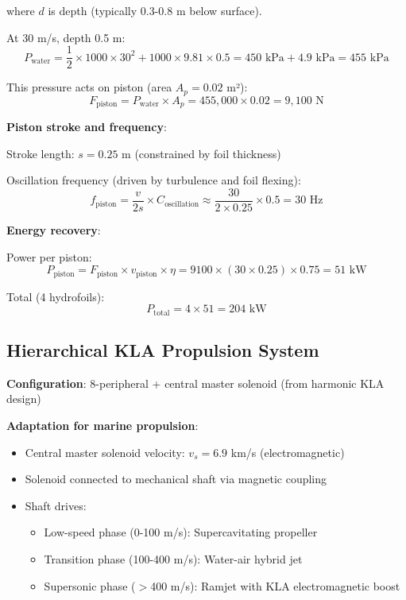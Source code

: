 \documentclass[12pt,a4paper]{article}
\begin{document}
where $d$ is depth (typically 0.3-0.8 m below surface).

At 30 m/s, depth 0.5 m:
\begin{equation}
P_{\text{water}} = \frac{1}{2} \times 1000 \times 30^2 + 1000 \times 9.81 \times 0.5 = 450 \text{ kPa} + 4.9 \text{ kPa} = 455 \text{ kPa}
\end{equation}

This pressure acts on piston (area $A_p = 0.02$ m²):
\begin{equation}
F_{\text{piston}} = P_{\text{water}} \times A_p = 455,000 \times 0.02 = 9,100 \text{ N}
\end{equation}

\textbf{Piston stroke and frequency}:

Stroke length: $s = 0.25$ m (constrained by foil thickness)

Oscillation frequency (driven by turbulence and foil flexing):
\begin{equation}
f_{\text{piston}} = \frac{v}{2s} \times C_{\text{oscillation}} \approx \frac{30}{2 \times 0.25} \times 0.5 = 30 \text{ Hz}
\end{equation}

\textbf{Energy recovery}:

Power per piston:
\begin{equation}
P_{\text{piston}} = F_{\text{piston}} \times v_{\text{piston}} \times \eta = 9100 \times (30 \times 0.25) \times 0.75 = 51 \text{ kW}
\end{equation}

Total (4 hydrofoils):
\begin{equation}
P_{\text{total}} = 4 \times 51 = 204 \text{ kW}
\end{equation}

\subsection{Hierarchical KLA Propulsion System}

\textbf{Configuration}: 8-peripheral + central master solenoid (from harmonic KLA design)

\textbf{Adaptation for marine propulsion}:
\begin{itemize}
\item Central master solenoid velocity: $v_s = 6.9$ km/s (electromagnetic)
\item Solenoid connected to mechanical shaft via magnetic coupling
\item Shaft drives:
  \begin{itemize}
  \item Low-speed phase (0-100 m/s): Supercavitating propeller
  \item Transition phase (100-400 m/s): Water-air hybrid jet
  \item Supersonic phase ($>$400 m/s): Ramjet with KLA electromagnetic boost
  \end{itemize}
\end{itemize}
\end{document}
